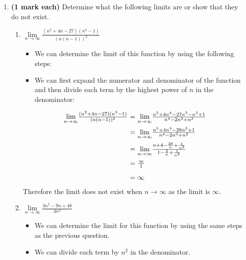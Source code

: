 \documentclass[12pt]{report}
\begin{document}
\begin{enumerate}[leftmargin=\labelsep]
    \item {\bf (1 mark each)} Determine what the following limits are or show that they do not exist.
        \begin{enumerate}
            \item $ {\lim \limits_{{n\rightarrow \infty}}} \frac{(n^2+4 n-27)(n^3-1)}{(n(n-1))^2} $
                \begin{tcolorbox}
                    \begin{itemize}[label={}]
                        \item We can determine the limit of this function by using the following steps:
                        \item We can first expand the numerator and denominator of the function and then divide each term by the highest power of $n$ in the denominator:
                    \end{itemize}
                    \begin{equation*}
                        \begin{array}{r@{~=~}l}
                            {\lim \limits_{{n\rightarrow \infty}}} \frac{(n^2+4 n-27)(n^3-1)}{(n(n-1))^2} & {\lim \limits_{{n\rightarrow \infty}}} \frac{n^5+4n^4-27n^3-n^3+1}{n^4-2n^3+n^2} \\ [2ex]
                            & {\lim \limits_{{n\rightarrow \infty}}} \frac{n^5+4n^4-28n^3+1}{n^4-2n^3+n^2} \\ [2ex]
                            & {\lim \limits_{{n\rightarrow \infty}}} \frac{n+4-\frac{28}{n}+\frac{1}{n^3}}{1-\frac{2}{n}+\frac{1}{n^2}} \\ [2ex]
                            & \frac{\infty}{1} \\ [2ex]
                            & \infty
                        \end{array}
                    \end{equation*}
                    Therefore the limit does not exist when $n \rightarrow \infty$ as the limit is $\infty$.
                \end{tcolorbox}
            \item $\lim \limits_{n\rightarrow \infty} \frac{3n^2-9n + 48}{4n^3}$
                \begin{tcolorbox}
                    \begin{itemize}[label={}]
                        \item We can determine the limit for this function by using the same steps as the previous question.
                        \item We can divide each term by $n^2$ in the denominator.

\end{itemize}
\end{tcolorbox}
\end{enumerate}
\end{enumerate}
\end{document}
